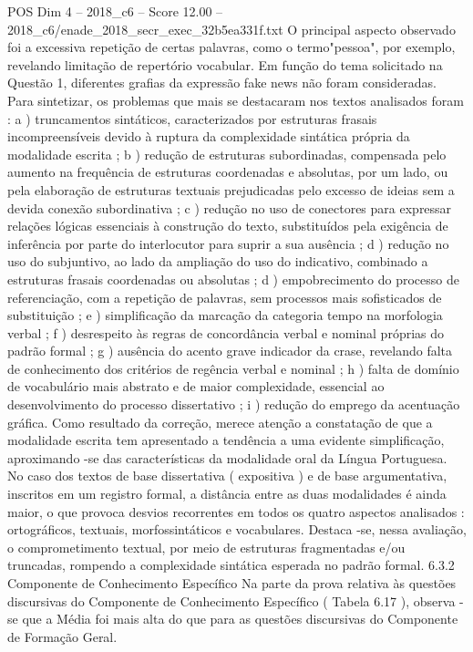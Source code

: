 \begin{textsample}{POS Dim 4 – 2018\_c6 – Score 12.00 – 2018\_c6/enade\_2018\_secr\_exec\_32b5ea331f.txt}
O principal aspecto observado foi a excessiva repetição de certas palavras, como o termo"pessoa", por exemplo, revelando limitação de repertório vocabular.
Em função do tema solicitado na Questão 1, diferentes grafias da expressão fake news não foram consideradas.
Para sintetizar, os problemas que mais se destacaram nos textos analisados foram : a ) truncamentos sintáticos, caracterizados por estruturas frasais incompreensíveis devido à ruptura da complexidade sintática própria da modalidade escrita ; b ) redução de estruturas subordinadas, compensada pelo aumento na frequência de estruturas coordenadas e absolutas, por um lado, ou pela elaboração de estruturas textuais prejudicadas pelo excesso de ideias sem a devida conexão subordinativa ; c ) redução no uso de conectores para expressar relações lógicas essenciais à construção do texto, substituídos pela exigência de inferência por parte do interlocutor para suprir a sua ausência ; d ) redução no uso do subjuntivo, ao lado da ampliação do uso do indicativo, combinado a estruturas frasais coordenadas ou absolutas ; d ) empobrecimento do processo de referenciação, com a repetição de palavras, sem processos mais sofisticados de substituição ; e ) simplificação da marcação da categoria tempo na morfologia verbal ; f ) desrespeito às regras de concordância verbal e nominal próprias do padrão formal ; g ) ausência do acento grave indicador da crase, revelando falta de conhecimento dos critérios de regência verbal e nominal ; h ) falta de domínio de vocabulário mais abstrato e de maior complexidade, essencial ao desenvolvimento do processo dissertativo ; i ) redução do emprego da acentuação gráfica.
Como resultado da correção, merece atenção a constatação de que a modalidade escrita tem apresentado a tendência a uma evidente simplificação, aproximando -se das características da modalidade oral da Língua Portuguesa.
No caso dos textos de base dissertativa ( expositiva ) e de base argumentativa, inscritos em um registro formal, a distância entre as duas modalidades é ainda maior, o que provoca desvios recorrentes em todos os quatro aspectos analisados : ortográficos, textuais, morfossintáticos e vocabulares.
Destaca -se, nessa avaliação, o comprometimento textual, por meio de estruturas fragmentadas e/ou truncadas, rompendo a complexidade sintática esperada no padrão formal. 6.3.2 Componente de Conhecimento Específico Na parte da prova relativa às questões discursivas do Componente de Conhecimento Específico ( Tabela 6.17 ), observa -se que a Média foi mais alta do que para as questões discursivas do Componente de Formação Geral.

\end{textsample}
